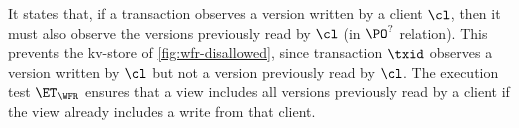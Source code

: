 It states that, if a transaction observes a version written by a
client $\cl$, then it must also observe the versions previously read by $\cl$ (in $\PO^?$ relation).
This prevents the kv-store of \cref{fig:wfr-disallowed},
since transaction $\txid$ observes a version written by $\cl$ but
not a version previously read by $\cl$.
The execution test $\ET_{\WFR}$  ensures
that a view includes all versions previously read by a client 
if the view already includes a write from that client. 



